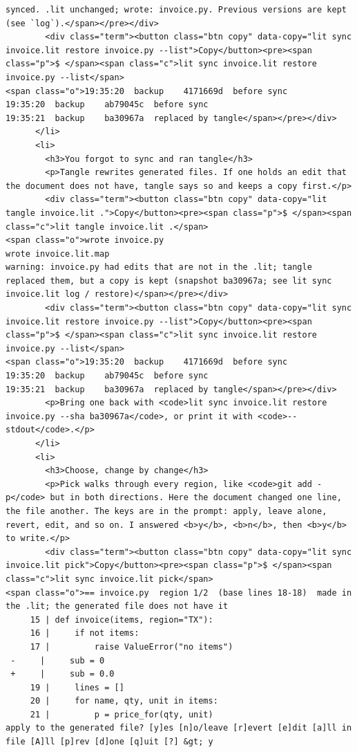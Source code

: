 \documentclass[10pt,a4paper]{article}
\begin{document}
\begin{Verbatim}
synced. .lit unchanged; wrote: invoice.py. Previous versions are kept (see `log`).</span></pre></div>
        <div class="term"><button class="btn copy" data-copy="lit sync invoice.lit restore invoice.py --list">Copy</button><pre><span class="p">$ </span><span class="c">lit sync invoice.lit restore invoice.py --list</span>
<span class="o">19:35:20  backup    4171669d  before sync
19:35:20  backup    ab79045c  before sync
19:35:21  backup    ba30967a  replaced by tangle</span></pre></div>
      </li>
      <li>
        <h3>You forgot to sync and ran tangle</h3>
        <p>Tangle rewrites generated files. If one holds an edit that the document does not have, tangle says so and keeps a copy first.</p>
        <div class="term"><button class="btn copy" data-copy="lit tangle invoice.lit .">Copy</button><pre><span class="p">$ </span><span class="c">lit tangle invoice.lit .</span>
<span class="o">wrote invoice.py
wrote invoice.lit.map
warning: invoice.py had edits that are not in the .lit; tangle replaced them, but a copy is kept (snapshot ba30967a; see lit sync invoice.lit log / restore)</span></pre></div>
        <div class="term"><button class="btn copy" data-copy="lit sync invoice.lit restore invoice.py --list">Copy</button><pre><span class="p">$ </span><span class="c">lit sync invoice.lit restore invoice.py --list</span>
<span class="o">19:35:20  backup    4171669d  before sync
19:35:20  backup    ab79045c  before sync
19:35:21  backup    ba30967a  replaced by tangle</span></pre></div>
        <p>Bring one back with <code>lit sync invoice.lit restore invoice.py --sha ba30967a</code>, or print it with <code>--stdout</code>.</p>
      </li>
      <li>
        <h3>Choose, change by change</h3>
        <p>Pick walks through every region, like <code>git add -p</code> but in both directions. Here the document changed one line, the file another. The keys are in the prompt: apply, leave alone, revert, edit, and so on. I answered <b>y</b>, <b>n</b>, then <b>y</b> to write.</p>
        <div class="term"><button class="btn copy" data-copy="lit sync invoice.lit pick">Copy</button><pre><span class="p">$ </span><span class="c">lit sync invoice.lit pick</span>
<span class="o">== invoice.py  region 1/2  (base lines 18-18)  made in the .lit; the generated file does not have it
     15 | def invoice(items, region="TX"):
     16 |     if not items:
     17 |         raise ValueError("no items")
 -     |     sub = 0
 +     |     sub = 0.0
     19 |     lines = []
     20 |     for name, qty, unit in items:
     21 |         p = price_for(qty, unit)
apply to the generated file? [y]es [n]o/leave [r]evert [e]dit [a]ll in file [A]ll [p]rev [d]one [q]uit [?] &gt; y

\end{Verbatim}
\end{document}

